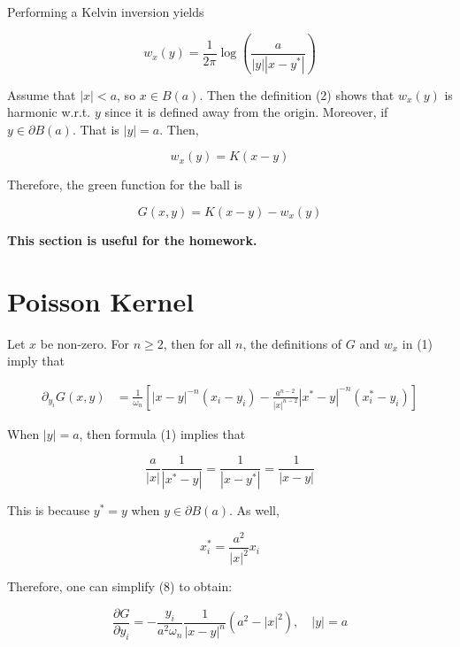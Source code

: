\documentclass{article}
\newtheorem{one minute paper}[theorem]{One Minute Paper}
\begin{document}
Performing a Kelvin inversion yields 

\begin{equation}
    w_x(y) = \frac{1}{2\pi}\log\left( \frac{a}{|y||x- y^*|} \right)
\end{equation}

Assume that $|x| < a$, so $x \in B(a)$. Then the definition (2) shows that $w_x(y)$ is harmonic w.r.t. $y$ since it is defined away from the origin. 
Moreover, if $y \in \partial B(a)$. That is $|y| = a$. Then, 

\begin{equation}
    w_x(y) = K(x-y)
\end{equation}

Therefore, the green function for the ball is 

\begin{equation}
    G(x,y) = K(x-y) - w_x(y)
\end{equation}

\textbf{This section is useful for the homework.}

\section*{Poisson Kernel}

Let $x$ be non-zero. For $n \geq 2$, then for all $n$, the definitions of $G$ and $w_x$ in (1) imply that 

\begin{align}
    \partial_{y_i}G(x,y) &= \frac{1}{\omega_n}\left[ |x-y|^{-n}(x_i - y_i) - \frac{a^{n-2}}{|x|^{n-2}}|x^* - y|^{-n}(x_i^* - y_i) \right]
\end{align}

When $|y| = a$, then formula (1) implies that 

\begin{equation}
    \frac{a}{|x|}\frac{1}{|x^* - y|} = \frac{1}{|x-y^*|} = \frac{1}{|x-y|}
\end{equation}

This is because $y^* = y$ when $y \in \partial B(a)$. As well, 

\begin{equation}
    x_i^* = \frac{a^2}{|x|^2}x_i
\end{equation}

Therefore, one can simplify (8) to obtain: 

\begin{equation}
    \frac{\partial G}{\partial y_i} = -\frac{y_i}{a^2 \omega_n}\frac{1}{|x-y|^n}(a^2 - |x|^2), \quad |y| = a
\end{equation}
\end{document}
